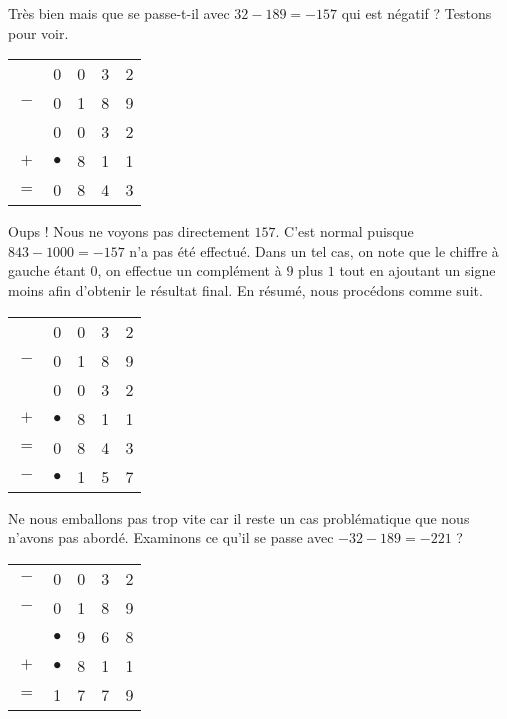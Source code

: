 \smallskip

Très bien mais que se passe-t-il avec $32 - 189 = -157$ qui est négatif ? Testons pour voir.
\begin{center}
\begin{tabular}{ccccc}
	    & 0 & 0 & 3 & 2 \\
	$-$ & 0 & 1 & 8 & 9 \\
	\hline
	\hline
	    & 0 & 0 & 3 & 2 \\
	$+$ & $\bullet$ & 8 & 1 & 1 \\
	\hline
    $=$ & 0 & 8 & 4 & 3 \\
\end{tabular}
\end{center}
Oups ! Nous ne voyons pas directement $157$. C'est normal puisque $843 - 1000 = -157$ n'a pas été effectué.
Dans un tel cas, on note que le chiffre à gauche étant $0$, on effectue un complément à $9$ plus $1$ tout en ajoutant un signe moins afin d'obtenir le résultat final.
En résumé, nous procédons comme suit. 
\begin{center}
\begin{tabular}{ccccc}
	    & 0 & 0 & 3 & 2 \\
	$-$ & 0 & 1 & 8 & 9 \\
	\hline
	\hline
	    & 0 & 0 & 3 & 2 \\
	$+$ & $\bullet$ & 8 & 1 & 1 \\
	\hline
    $=$ & 0 & 8 & 4 & 3 \\
	\hline
	\hline
	$-$ & $\bullet$ & 1 & 5 & 7 \\
\end{tabular}
\end{center}


\smallskip

Ne nous emballons pas trop vite car il reste un cas problématique que nous n'avons pas abordé.
Examinons ce qu'il se passe avec $-32 - 189 = - 221$ ?
\begin{center}
\begin{tabular}{ccccc}
	$-$ & 0 & 0 & 3 & 2 \\
	$-$ & 0 & 1 & 8 & 9 \\
	\hline
	\hline
	    & $\bullet$ & 9 & 6 & 8 \\
	$+$ & $\bullet$ & 8 & 1 & 1 \\
	\hline
    $=$ & 1 & 7 & 7 & 9 \\
\end{tabular}
\end{center}

